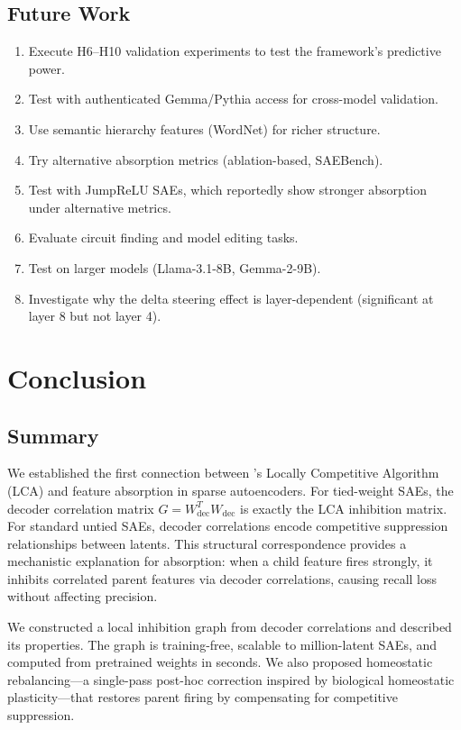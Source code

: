 \documentclass{article}
\begin{document}
\subsection{Future Work}

\begin{enumerate}
    \item Execute H6--H10 validation experiments to test the framework's predictive power.
    \item Test with authenticated Gemma/Pythia access for cross-model validation.
    \item Use semantic hierarchy features (WordNet) for richer structure.
    \item Try alternative absorption metrics (ablation-based, SAEBench).
    \item Test with JumpReLU SAEs, which reportedly show stronger absorption under alternative metrics.
    \item Evaluate circuit finding and model editing tasks.
    \item Test on larger models (Llama-3.1-8B, Gemma-2-9B).
    \item Investigate why the delta steering effect is layer-dependent (significant at layer 8 but not layer 4).
\end{enumerate}

\section{Conclusion}
\label{sec:conclusion}

\subsection{Summary}

We established the first connection between \citet{rozell2008sparse}'s Locally Competitive Algorithm (LCA) and feature absorption in sparse autoencoders. For tied-weight SAEs, the decoder correlation matrix $G = W_{\text{dec}}^T W_{\text{dec}}$ is exactly the LCA inhibition matrix. For standard untied SAEs, decoder correlations encode competitive suppression relationships between latents. This structural correspondence provides a mechanistic explanation for absorption: when a child feature fires strongly, it inhibits correlated parent features via decoder correlations, causing recall loss without affecting precision.

We constructed a local inhibition graph from decoder correlations and described its properties. The graph is training-free, scalable to million-latent SAEs, and computed from pretrained weights in seconds. We also proposed homeostatic rebalancing---a single-pass post-hoc correction inspired by biological homeostatic plasticity---that restores parent firing by compensating for competitive suppression.
\end{document}
